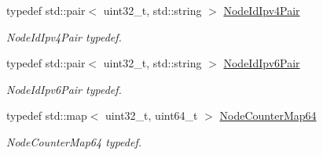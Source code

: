 \begin{DoxyCompactItemize}
typedef std\+::pair$<$ uint32\+\_\+t, std\+::string $>$ \hyperlink{classns3_1_1AnimationInterface_ab4227c3587cfdddd08d58c242a03c0bd}{Node\+Id\+Ipv4\+Pair}
\begin{DoxyCompactList}\small\item\em Node\+Id\+Ipv4\+Pair typedef. \end{DoxyCompactList}\item 
typedef std\+::pair$<$ uint32\+\_\+t, std\+::string $>$ \hyperlink{classns3_1_1AnimationInterface_a907f642360ff52db2dff01f49049f3b8}{Node\+Id\+Ipv6\+Pair}
\begin{DoxyCompactList}\small\item\em Node\+Id\+Ipv6\+Pair typedef. \end{DoxyCompactList}\item 
typedef std\+::map$<$ uint32\+\_\+t, uint64\+\_\+t $>$ \hyperlink{classns3_1_1AnimationInterface_a8bd3daf0ee1a2bbebced596061bd012b}{Node\+Counter\+Map64}
\begin{DoxyCompactList}\small\item\em Node\+Counter\+Map64 typedef. \end{DoxyCompactList}\end{DoxyCompactItemize}
